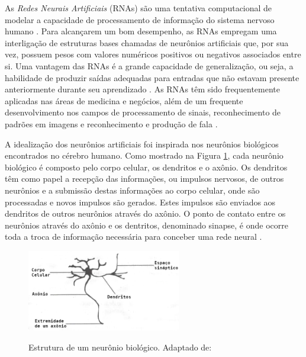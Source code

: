 
As \emph{Redes Neurais Artificiais} (RNAs) são uma tentativa computacional de modelar a capacidade de processamento de informação do sistema nervoso humano \cite{rojas}. Para alcançarem um bom desempenho, as RNAs empregam uma interligação de estruturas bases chamadas de neurônios artificiais que, por sua vez, possuem pesos com valores numéricos positivos ou negativos associados entre si. Uma vantagem das RNAs é a grande capacidade de generalização, ou seja, a habilidade de produzir saídas adequadas para entradas que não estavam presente anteriormente durante seu aprendizado \cite{haykin}. As RNAs têm sido frequentemente aplicadas nas áreas de medicina e negócios, além de um frequente desenvolvimento nos campos de processamento de sinais, reconhecimento de padrões em imagens e reconhecimento e produção de fala \cite{fausett}.

A idealização dos neurônios artificiais foi inspirada nos neurônios biológicos encontrados no cérebro humano. Como mostrado na Figura \ref{fig:neuronio}, cada neurônio biológico é composto pelo corpo celular, os dendritos e o axônio. Os dendritos têm como papel a recepção das informações, ou impulsos nervosos, de outros neurônios e a submissão destas informações ao corpo celular, onde são processadas e novos impulsos são gerados. Estes impulsos são enviados aos dendritos de outros neurônios através do axônio. O ponto de contato entre os neurônios através do axônio e os dentritos, denominado sinapse, é onde ocorre toda a troca de informação necessária para conceber uma rede neural \cite{braga}.

\begin{figure}[h!]
\centering
\caption{Estrutura de um neurônio biológico. Adaptado de: \cite{braga}}
\includegraphics[width=0.6\textwidth]{imgs/neuronio}
\label{fig:neuronio}
\end{figure}

